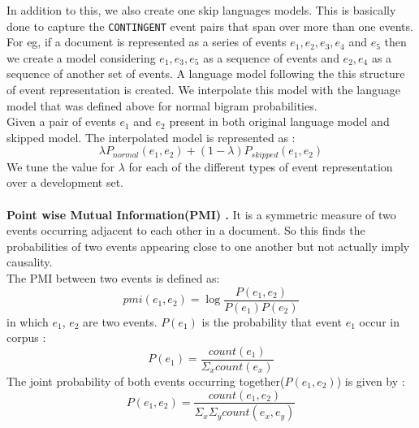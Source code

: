 \documentclass[12pt]{article}
\begin{document}
In addition to this, we also create one skip languages models. This is basically done to capture the \texttt{CONTINGENT} event pairs that span over more than one events. For eg, if a document is represented as a series of events $e_1, e_2, e_3, e_4$ and $e_5$ then we create a model considering $e_1, e_3, e_5$ as a sequence of events and $e_2, e_4$ as a sequence of another set of events. A language model following the this structure of event representation is created. We interpolate this model with the language model that was defined above for normal bigram probabilities. \\
Given a pair of events $e_1$ and $e_2$ present in both original language model and skipped model. The interpolated model is represented as : 
\begin{equation}\label{weight}
	\lambda P_{normal}(e_1,e_2) + (1-\lambda) P_{skipped}(e_1,e_2)
\end{equation} 
We tune the value for $\lambda$ for each of the different types of event representation over a development set. \\
\smallskip \\

{\bf Point wise Mutual Information(PMI) .}  It is a symmetric measure of two events occurring adjacent to each other in a document. So this finds the probabilities of two events appearing close to one another but not actually imply causality\cite{nec,cloze}. \\
The PMI between two events is defined as: 
\begin{equation}\label{pmi}
pmi(e_1,e_2) = \log\frac{P(e_1,e_2)}{P(e_1)P(e_2)}
\end{equation}
in which $e_1$, $e_2$ are two events. $P(e_1)$ is the probability that event $e_1$ occur in corpus : 
\begin{equation}
P(e_1) = \frac{count(e_1)}{\Sigma_x count(e_x)}
\end{equation}
The joint probability of both events occurring together($P(e_1,e_2)$) is given by :
\begin{equation}
P(e_1,e_2) = \frac{count(e_1,e_2)}{\Sigma_x \Sigma_y count(e_x,e_y)}
\end{equation}
\end{document}
